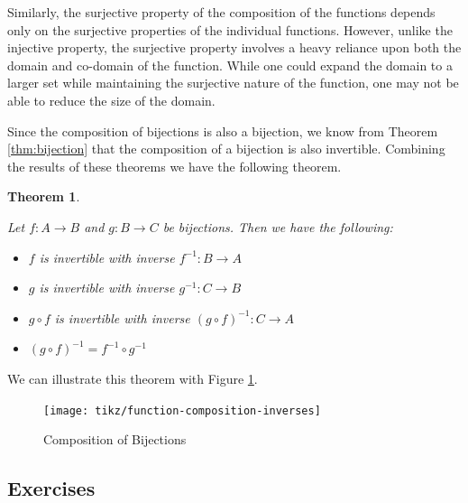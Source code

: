 \documentclass[
]{book}
\newtheorem{theorem}{Theorem}[chapter]
\theoremstyle{definition}
\theoremstyle{definition}
\theoremstyle{definition}
\theoremstyle{definition}
\theoremstyle{remark}
\begin{document}
Similarly, the surjective property of the composition of the functions depends only on the surjective properties of the individual functions. However, unlike the injective property, the surjective property involves a heavy reliance upon both the domain and co-domain of the function. While one could expand the domain to a larger set while maintaining the surjective nature of the function, one may not be able to reduce the size of the domain.

Since the composition of bijections is also a bijection, we know from Theorem \ref{thm:bijection} that the composition of a bijection is also invertible. Combining the results of these theorems we have the following theorem.

\begin{theorem}
\protect\hypertarget{thm:unlabeled-div-71}{}\label{thm:unlabeled-div-71}

Let \(f:A\rightarrow B\) and \(g:B\rightarrow C\) be bijections. Then we have the following:

\begin{itemize}
\item
  \(f\) is invertible with inverse \(f^{-1}:B\rightarrow A\)
\item
  \(g\) is invertible with inverse \(g^{-1}:C\rightarrow B\)
\item
  \(g\circ f\) is invertible with inverse \((g\circ f)^{-1}:C\rightarrow A\)
\item
  \((g\circ f)^{-1} = f^{-1} \circ g^{-1}\)
\end{itemize}

\end{theorem}

We can illustrate this theorem with Figure \ref{fig:composition-bijections}.

\begin{figure}
 
 {\centering \texttt{[image: tikz/function-composition-inverses]} 
 
 }
 
 \caption{Composition of Bijections}\label{fig:composition-bijections}
 \end{figure}

\hypertarget{exercises-18}{%
\subsection{Exercises}\label{exercises-18}}
\end{document}
